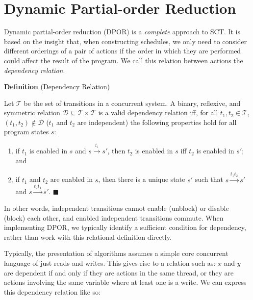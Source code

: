 \section{Dynamic Partial-order Reduction}
\label{sec:sct-dpor}

Dynamic partial-order reduction (DPOR)\cite{flanagan2005,godefroid1996} is a
\emph{complete} approach to SCT\@.  It is based on the insight that, when
constructing schedules, we only need to consider different orderings of a pair
of actions if the order in which they are performed could affect the
result of the program.  We call this relation between actions
the \emph{dependency relation}.

\begin{displayquote}
  \textbf{Definition} (Dependency Relation\cite{flanagan2005})

  \noindent
  Let $\mathcal T$ be the set of transitions in a concurrent system.  A binary,
  reflexive, and symmetric relation $\mathcal D \subseteq \mathcal
  T \times \mathcal T$ is a valid dependency relation iff, for all $t_{1},
  t_{2} \in \mathcal T$, $(t_{1}, t_{2}) \notin \mathcal D$ ($t_{1}$ and $t_{2}$
  are independent) the following properties hold for all program states $s$:

  \begin{enumerate}
  \item if $t_{1}$ is enabled in $s$ and $s \xrightarrow{t_{1}} s'$, then
    $t_{2}$ is enabled in $s$ iff $t_{2}$ is enabled in $s'$; and

  \item if $t_{1}$ and $t_{2}$ are enabled in $s$, then there is a unique state
    $s'$ such that $s \xrightarrow{t_{1}t_{2}} s'$ and
    $s \xrightarrow{t_{2}t_{1}} s'$.
    \hfill$\blacksquare$
  \end{enumerate}
\end{displayquote}

In other words, independent transitions cannot enable (unblock) or
disable (block) each other, and enabled independent transitions
commute.  When implementing DPOR, we typically identify a sufficient
condition for dependency, rather than work with this relational
definition directly.

Typically, the presentation of algorithms assumes a simple core
concurrent language of just reads and writes.  This gives rise to a
relation such as: $x$ and $y$ are dependent if and only if they are
actions in the same thread, or they are actions involving the same
variable where at least one is a write.  We can express this
dependency relation like so:

